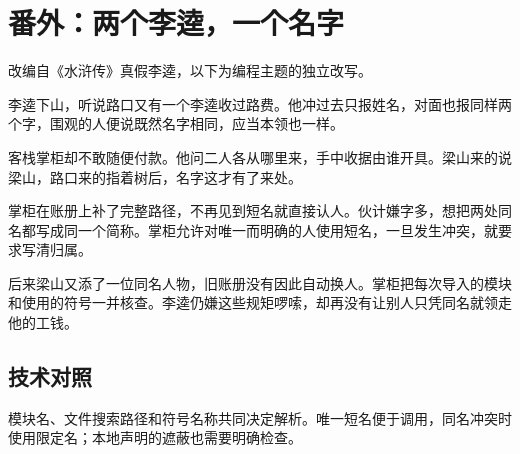 \section{番外：两个李逵，一个名字}

改编自《水浒传》真假李逵，以下为编程主题的独立改写。

李逵下山，听说路口又有一个李逵收过路费。他冲过去只报姓名，对面也报同样两个字，围观的人便说既然名字相同，应当本领也一样。

客栈掌柜却不敢随便付款。他问二人各从哪里来，手中收据由谁开具。梁山来的说梁山，路口来的指着树后，名字这才有了来处。

掌柜在账册上补了完整路径，不再见到短名就直接认人。伙计嫌字多，想把两处同名都写成同一个简称。掌柜允许对唯一而明确的人使用短名，一旦发生冲突，就要求写清归属。

后来梁山又添了一位同名人物，旧账册没有因此自动换人。掌柜把每次导入的模块和使用的符号一并核查。李逵仍嫌这些规矩啰嗦，却再没有让别人只凭同名就领走他的工钱。

\subsection*{技术对照}

模块名、文件搜索路径和符号名称共同决定解析。唯一短名便于调用，同名冲突时使用限定名；本地声明的遮蔽也需要明确检查。
